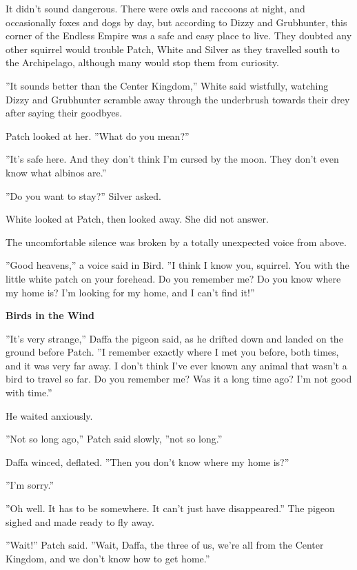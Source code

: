 \documentclass[11pt]{article}
\begin{document}
 It didn't sound dangerous. There were owls and raccoons at night, and occasionally foxes and dogs by day, but according to Dizzy and Grubhunter, this corner of the Endless Empire was a safe and easy place to live. They doubted any other squirrel would trouble Patch, White and Silver as they travelled south to the Archipelago, although many would stop them from curiosity.\par
 ''It sounds better than the Center Kingdom,'' White said wistfully, watching Dizzy and Grubhunter scramble away through the underbrush towards their drey after saying their goodbyes.\par
 Patch looked at her. ''What do you mean?''\par
 ''It's safe here. And they don't think I'm cursed by the moon. They don't even know what albinos are.''\par
 ''Do you want to stay?'' Silver asked.\par
 White looked at Patch, then looked away. She did not answer.\par
 The uncomfortable silence was broken by a totally unexpected voice from above.\par
 ''Good heavens,'' a voice said in Bird. ''I think I know you, squirrel. You with the little white patch on your forehead. Do you remember me? Do you know where my home is? I'm looking for my home, and I can't find it!''\par
\par
{\bf Birds in the Wind\par
}\par
 ''It's very strange,'' Daffa the pigeon said, as he drifted down and landed on the ground before Patch. ''I remember exactly where I met you before, both times, and it was very far away. I don't think I've ever known any animal that wasn't a bird to travel so far. Do you remember me? Was it a long time ago? I'm not good with time.''\par
 He waited anxiously.\par
 ''Not so long ago,'' Patch said slowly, ''not so long.''\par
 Daffa winced, deflated. ''Then you don't know where my home is?''\par
 ''I'm sorry.''\par
 ''Oh well. It has to be somewhere. It can't just have disappeared.'' The pigeon sighed and made ready to fly away.\par
 ''Wait!'' Patch said. ''Wait, Daffa, the three of us, we're all from the Center Kingdom, and we don't know how to get home.''\par
\end{document}
